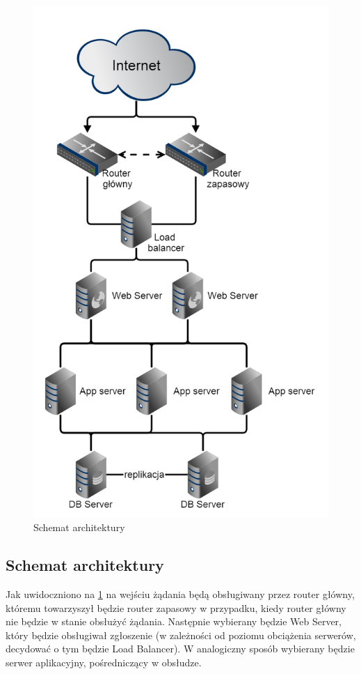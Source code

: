 \begin{figure}[h!]
	\centering
	\includegraphics[scale=0.4]{img/architektura}
	\caption{Schemat architektury \label{fig:labelArchitecture}}
\end{figure}

\subsection{Schemat architektury}

Jak uwidoczniono na \ref*{fig:labelArchitecture} na wejściu żądania będą obsługiwany przez router główny, któremu towarzyszył będzie router zapasowy w przypadku, kiedy router główny nie będzie w stanie obsłużyć żądania. Następnie wybierany będzie Web Server, który będzie obsługiwał zgłoszenie (w zależności od poziomu obciążenia serwerów, decydować o tym będzie Load Balancer). W analogiczny sposób wybierany będzie serwer aplikacyjny, pośredniczący w obsłudze.

